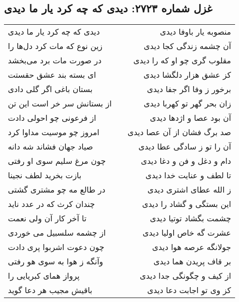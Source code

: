 \begin{center}
\section*{غزل شماره ۲۷۲۳: دیدی که چه کرد یار ما دیدی}
\label{sec:2723}
\begin{longtable}{l p{0.5cm} r}
دیدی که چه کرد یار ما دیدی
&&
منصوبه یار باوفا دیدی
\\
زین نوع که مات کرد دل‌ها را
&&
آن چشمه زندگی کجا دیدی
\\
در صورت مات برد می‌بخشد
&&
مقلوب گری چو او که را دیدی
\\
ای بسته بند عشق حقستت
&&
کز عشق هزار دلگشا دیدی
\\
بستان باغی اگر گلی دادی
&&
برخور ز وفا اگر جفا دیدی
\\
از بستانش سر خر است این تن
&&
زان بحر گهر تو کهربا دیدی
\\
از فرعونی چو احولی دادت
&&
آن بود عصا و اژدها دیدی
\\
امروز چو موسیت مداوا کرد
&&
صد برگ فشان از آن عصا دیدی
\\
صیاد جهان فشاند شه دانه
&&
آن را تو ز سادگی عطا دیدی
\\
چون مرغ سلیم سوی او رفتی
&&
دام و دغل و فن و دغا دیدی
\\
بازت بخرید لطف نجینا
&&
تا لطف و عنایت خدا دیدی
\\
در طالع مه چو مشتری گشتی
&&
ز الله عطای اشتری دیدی
\\
چندان کرث که در عدد ناید
&&
این بستگی و گشاد را دیدی
\\
تا آخر کار آن ولی نعمت
&&
چشمت بگشاد توتیا دیدی
\\
از چشمه سلسبیل می خوردی
&&
عشرت گه خاص اولیا دیدی
\\
چون دعوت اشربوا پری دادت
&&
جولانگه عرصه هوا دیدی
\\
وآنگه ز هوا به سوی هو رفتی
&&
بر قاف پریدن هما دیدی
\\
پرواز همای کبریایی را
&&
از کیف و چگونگی جدا دیدی
\\
باقیش مجیب هر دعا گوید
&&
کز وی تو اجابت دعا دیدی
\\
\end{longtable}
\end{center}
